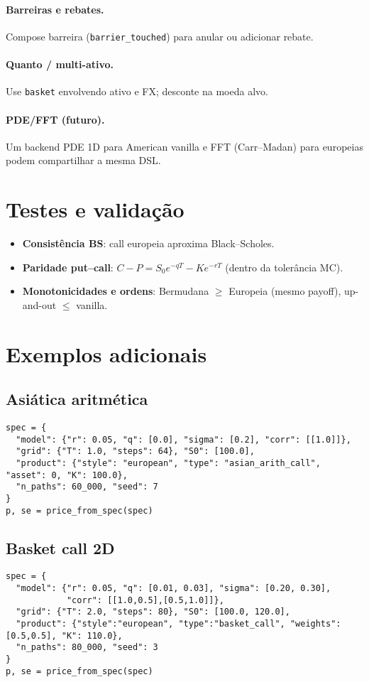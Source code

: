 \documentclass[11pt,a4paper]{article}
\begin{document}
\paragraph{Barreiras e rebates.} Compose barreira (\texttt{barrier\_touched}) para anular ou adicionar rebate.
\paragraph{Quanto / multi-ativo.} Use \texttt{basket} envolvendo ativo e FX; desconte na moeda alvo.
\paragraph{PDE/FFT (futuro).} Um backend PDE 1D para American vanilla e FFT (Carr--Madan) para europeias podem compartilhar a mesma DSL.

\section{Testes e validação}
\begin{itemize}[leftmargin=1.2em]
\item \textbf{Consistência BS}: call europeia aproxima Black--Scholes.
\item \textbf{Paridade put--call}: $C - P = S_0 e^{-qT} - K e^{-rT}$ (dentro da tolerância MC).
\item \textbf{Monotonicidades e ordens}: Bermudana $\ge$ Europeia (mesmo payoff), up-and-out $\le$ vanilla.
\end{itemize}

\section{Exemplos adicionais}
\subsection{Asiática aritmética}
\begin{lstlisting}[style=pystyle]
spec = {
  "model": {"r": 0.05, "q": [0.0], "sigma": [0.2], "corr": [[1.0]]},
  "grid": {"T": 1.0, "steps": 64}, "S0": [100.0],
  "product": {"style": "european", "type": "asian_arith_call", "asset": 0, "K": 100.0},
  "n_paths": 60_000, "seed": 7
}
p, se = price_from_spec(spec)
\end{lstlisting}

\subsection{Basket call 2D}
\begin{lstlisting}[style=pystyle]
spec = {
  "model": {"r": 0.05, "q": [0.01, 0.03], "sigma": [0.20, 0.30],
            "corr": [[1.0,0.5],[0.5,1.0]]},
  "grid": {"T": 2.0, "steps": 80}, "S0": [100.0, 120.0],
  "product": {"style":"european", "type":"basket_call", "weights":[0.5,0.5], "K": 110.0},
  "n_paths": 80_000, "seed": 3
}
p, se = price_from_spec(spec)
\end{lstlisting}
\end{document}

